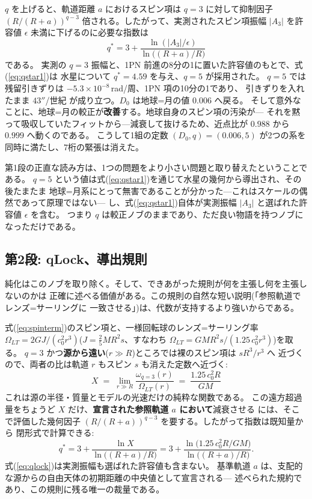 \documentclass[a4paper,10pt,twocolumn]{ltjsarticle}
\begin{document}
$q$ を上げると、軌道距離 $a$ におけるスピン項は $q=3$ に対して抑制因子
$(R/(R+a))^{q-3}$ 倍される。したがって、実測されたスピン項振幅 $|A_3|$ を許容値
$\epsilon$ 未満に下げるのに必要な指数は
\begin{equation}
  q^{*} = 3+\frac{\ln(|A_3|/\epsilon)}{\ln\bigl((R+a)/R\bigr)}
  \label{eq:qstar1}
\end{equation}
である。
実測の $q=3$ 振幅と、1PN 前進の8分の1に置いた許容値のもとで、式(\ref{eq:qstar1})は
水星について $q^{*}=4.59$ を与え、$q=5$ が採用された。
$q=5$ では残留引きずりは $-5.3\times10^{-8}$\,rad/周、1PN 項の10分の1であり、
引きずりを入れたまま $43''$/世紀 が成り立つ。$D_0$ は地球=月の値 $0.006$ へ戻る。
そして意外なことに、地球=月の較正が\textbf{改善}する。地球自身のスピン項の汚染が---
それを黙って吸収していたフィットから---減衰して抜けるため、近点比が $0.988$ から
$0.999$ へ動くのである。
こうして1組の定数 $(D_0,q)=(0.006,5)$ が2つの系を同時に満たし、7桁の緊張は消えた。

第1段の正直な読み方は、1つの問題をより小さい問題と取り替えたということである。
$q=5$ という値は式(\ref{eq:qstar1})を通じて水星の幾何から導出され、その後たまたま
地球=月系にとって無害であることが分かった---これはスケールの偶然であって原理ではない---
し、式(\ref{eq:qstar1})自体が実測振幅 $|A_3|$ と選ばれた許容値 $\epsilon$ を含む。
つまり $q$ は較正ノブのままであり、ただ良い物語を持つノブになっただけである。

\subsection{第2段: qLock、導出規則}
\label{sec:qlock}

純化はこのノブを取り除く。そして、できあがった規則が何を主張し何を主張しないのかは
正確に述べる価値がある。この規則の自然な短い説明(「参照軌道でレンズ=サーリングに
一致させる」)は、代数が支持するより強いからである。

式(\ref{eq:spinterm})のスピン項と、一様回転球のレンズ=サーリング率
$\Omega_{LT}=2GJ/(c_0^{2}r^{3})$($J=\tfrac{2}{5}MR^{2}s$、すなわち
$\Omega_{LT}=GMR^{2}s/(1.25\,c_0^{2}r^{3})$)を取る。
$q=3$ かつ\textbf{源から遠い}($r\gg R$)ところでは裸のスピン項は $sR^{3}/r^{3}$ へ
近づくので、両者の比は軌道 $r$ もスピン $s$ も消えた定数へ近づく:
\begin{equation}
  X \;=\; \lim_{r\gg R}\frac{\omega_{q=3}(r)}{\Omega_{LT}(r)}
    \;=\; \frac{1.25\,c_0^{2}R}{GM}
  \label{eq:X}
\end{equation}
これは源の半径・質量とモデルの光速だけの純粋な関数である。
この遠方超過量をちょうど $X$ だけ、\textbf{宣言された参照軌道 $a$ において}減衰させる
には、そこで評価した幾何因子 $(R/(R+a))^{q-3}$ を要する。したがって指数は既知量から
閉形式で計算できる:
\begin{equation}
  q^{*} = 3+\frac{\ln X}{\ln\bigl((R+a)/R\bigr)}
        = 3+\frac{\ln\bigl(1.25\,c_0^{2}R/GM\bigr)}
                 {\ln\bigl((R+a)/R\bigr)} .
  \label{eq:qlock}
\end{equation}
式(\ref{eq:qlock})は実測振幅も選ばれた許容値も含まない。
基準軌道 $a$ は、支配的な源からの自由天体の初期距離の中央値として宣言される---
述べられた規約であり、この規則に残る唯一の裁量である。
\end{document}
